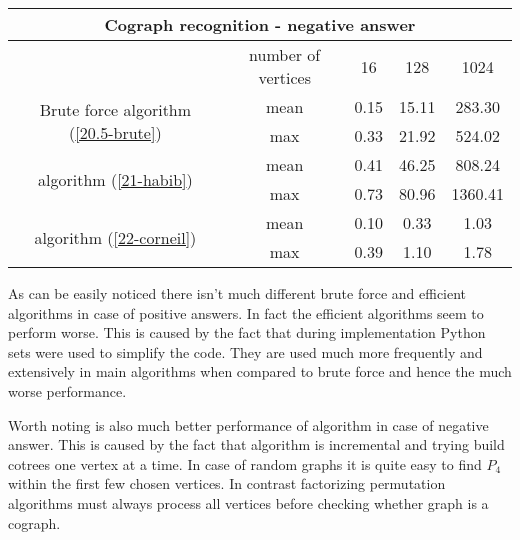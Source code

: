 \begin{center}

    \begin{tabular}{ |c|c|c|c|c|}
        \hline
        \multicolumn{5}{|c|}{Cograph recognition - negative answer}                                                \\
        \hline
                                                                     & number of vertices & 16   & 128   & 1024    \\
        \hline
        \multirow{2}{*}{Brute force algorithm (\ref{20.5-brute})}    & mean               & 0.15 & 15.11 & 283.30  \\
                                                                     & max                & 0.33 & 21.92 & 524.02  \\
        \hline
        \multirow{2}{*}{\cite{habib} algorithm (\ref{21-habib})}     & mean               & 0.41 & 46.25 & 808.24  \\
                                                                     & max                & 0.73 & 80.96 & 1360.41 \\
        \hline
        \multirow{2}{*}{\cite{corneil} algorithm (\ref{22-corneil})} & mean               & 0.10 & 0.33  & 1.03    \\
                                                                     & max                & 0.39 & 1.10  & 1.78    \\

        \hline
    \end{tabular}
\end{center}

As can be easily noticed there isn't much different brute force and efficient algorithms in case of positive answers. In fact the efficient algorithms seem to perform worse. This is caused by the fact that during implementation Python sets were used to simplify the code. They are used much more frequently and extensively in main algorithms when compared to brute force and hence the much worse performance.

Worth noting is also much better performance of \cite{corneil} algorithm in case of negative answer. This is caused by the fact that algorithm is incremental and trying build cotrees one vertex at a time. In case of random graphs it is quite easy to find $P_4$ within the first few chosen vertices. In contrast factorizing permutation algorithms must always process all vertices before checking whether graph is a cograph.

